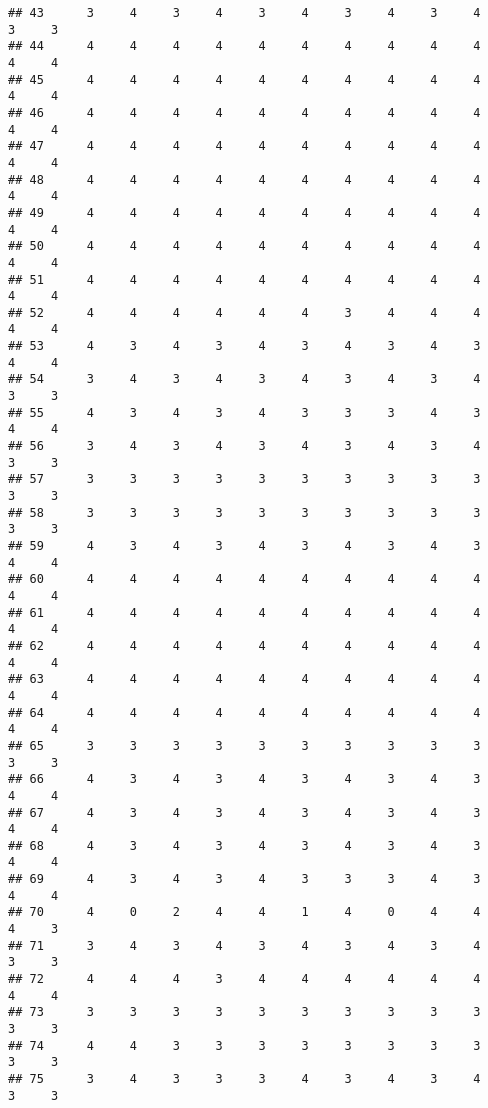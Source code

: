 \documentclass[
]{article}
\begin{document}
\begin{verbatim}
## 43      3     4     3     4     3     4     3     4     3     4     3     3
## 44      4     4     4     4     4     4     4     4     4     4     4     4
## 45      4     4     4     4     4     4     4     4     4     4     4     4
## 46      4     4     4     4     4     4     4     4     4     4     4     4
## 47      4     4     4     4     4     4     4     4     4     4     4     4
## 48      4     4     4     4     4     4     4     4     4     4     4     4
## 49      4     4     4     4     4     4     4     4     4     4     4     4
## 50      4     4     4     4     4     4     4     4     4     4     4     4
## 51      4     4     4     4     4     4     4     4     4     4     4     4
## 52      4     4     4     4     4     4     3     4     4     4     4     4
## 53      4     3     4     3     4     3     4     3     4     3     4     4
## 54      3     4     3     4     3     4     3     4     3     4     3     3
## 55      4     3     4     3     4     3     3     3     4     3     4     4
## 56      3     4     3     4     3     4     3     4     3     4     3     3
## 57      3     3     3     3     3     3     3     3     3     3     3     3
## 58      3     3     3     3     3     3     3     3     3     3     3     3
## 59      4     3     4     3     4     3     4     3     4     3     4     4
## 60      4     4     4     4     4     4     4     4     4     4     4     4
## 61      4     4     4     4     4     4     4     4     4     4     4     4
## 62      4     4     4     4     4     4     4     4     4     4     4     4
## 63      4     4     4     4     4     4     4     4     4     4     4     4
## 64      4     4     4     4     4     4     4     4     4     4     4     4
## 65      3     3     3     3     3     3     3     3     3     3     3     3
## 66      4     3     4     3     4     3     4     3     4     3     4     4
## 67      4     3     4     3     4     3     4     3     4     3     4     4
## 68      4     3     4     3     4     3     4     3     4     3     4     4
## 69      4     3     4     3     4     3     3     3     4     3     4     4
## 70      4     0     2     4     4     1     4     0     4     4     4     3
## 71      3     4     3     4     3     4     3     4     3     4     3     3
## 72      4     4     4     3     4     4     4     4     4     4     4     4
## 73      3     3     3     3     3     3     3     3     3     3     3     3
## 74      4     4     3     3     3     3     3     3     3     3     3     3
## 75      3     4     3     3     3     4     3     4     3     4     3     3

\end{verbatim}
\end{document}
